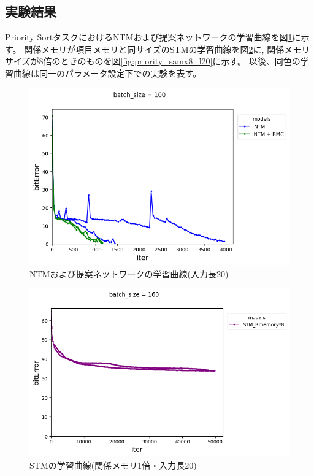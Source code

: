 \subsection{実験結果}
Priority SortタスクにおけるNTMおよび提案ネットワークの学習曲線を図\ref{fig:priority_rrnn_m20l20}に示す。
関係メモリが項目メモリと同サイズのSTMの学習曲線を図\ref{fig:priority_samx1_l20}に,
関係メモリサイズが8倍のときのものを図\ref{fig:priority_samx8_l20}に示す。
以後、同色の学習曲線は同一のパラメータ設定下での実験を表す。
\begin{figure}[t]
	\centering
	\includegraphics[width=\linewidth]{./figure/priority/rrnn_m20l20.png}
	\caption{NTMおよび提案ネットワークの学習曲線(入力長20)}
	\label{fig:priority_rrnn_m20l20}
\end{figure}
\begin{figure}[t]
	\centering
	\includegraphics[width=\linewidth]{./figure/priority/samx1l20.png}
	\caption{STMの学習曲線(関係メモリ1倍・入力長20)}
	\label{fig:priority_samx1_l20}
\end{figure}

